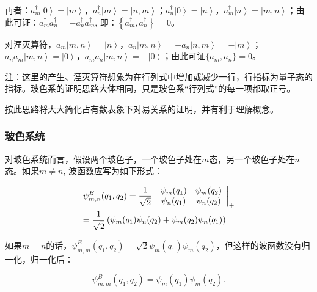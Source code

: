 再者：$a_m^\dag  \left| 0 \right\rangle  = \left| m \right\rangle
$，$a_n^\dag  \left| m \right\rangle  = \left| {n,m} \right\rangle
$；$a_n^\dag  \left| 0 \right\rangle  = \left| n \right\rangle
$，$a_m^\dag  \left| n \right\rangle  = \left| {m,n} \right\rangle
$；由此可证：$a_m^\dag a_n^\dag   =  - a_n^\dag  a_m^\dag $,
即：$\left\{ a_m^\dag , a_n^\dag \right\} = 0$。

对湮灭算符，$a_m \left| {m,n} \right\rangle  = \left| n
\right\rangle $，$a_n \left| {m,n} \right\rangle  =  - a_n \left|
{n,m} \right\rangle  =  - \left| m \right\rangle $；$a_n a_m \left|
{m,n} \right\rangle  = \left| 0 \right\rangle $，$a_m a_n \left|
{m,n} \right\rangle  =  - \left| 0 \right\rangle $；由此可证$\{a_m,
a_n\} =
0$。


注：这里的产生、湮灭算符想象为在行列式中增加或减少一行，行指标为量子态的指标。玻色系的证明思路大体相同，只是玻色系“行列式”的每一项都取正号。

按此思路将大大简化占有数表象下对易关系的证明，并有利于理解概念。


\subsubsection{玻色系统}

对玻色系统而言，假设两个玻色子，一个玻色子处在$m$态，另一个玻色子处在$n$态。如果$m
\ne n$, 波函数应写为如下形式：

\begin{equation}\label{two bosons wavefunction}
\begin{gathered}
\psi _{m,n}^B (q_1 ,q_2 ) = \frac{1} {{\sqrt 2 }}\left|
{\begin{array}{*{20}c}
   {\psi _m (q_1 )} & {\psi _m (q_2 )}  \\
   {\psi _n (q_1 )} & {\psi _n (q_2 )}  \\
\end{array} } \right|_+ \hfill \\
= \frac{1}{{\sqrt 2 }}\left( {\psi _m (q_1 )\psi _n (q_2 ) + \psi _m
(q_2 )\psi _n (q_1 )} \right) \hfill \\
\end{gathered}
\end{equation}


如果$m=n$的话，$\psi_{m,m}^B(q_1,q_2) = \sqrt 2
\psi_m(q_1)\psi_m(q_2)$，但这样的波函数没有归一化，归一化后：

\begin{equation*}
\psi_{m,m}^B(q_1,q_2) = \psi_m(q_1) \psi_m(q_2) .
\end{equation*}

